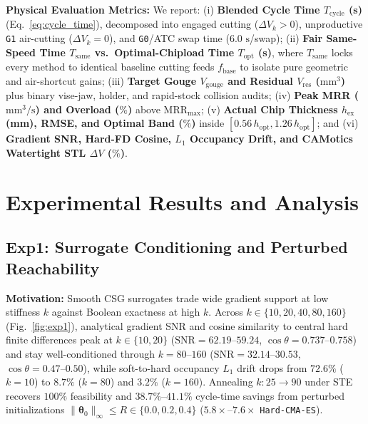 \documentclass[conference]{IEEEtran}
\begin{document}
\textbf{Physical Evaluation Metrics:}
We report: (i) \textbf{Blended Cycle Time $T_{\text{cycle}}$ (s)} (Eq.~\eqref{eq:cycle_time}), decomposed into engaged cutting ($\Delta V_k > 0$), unproductive \texttt{G1} air-cutting ($\Delta V_k = 0$), and \texttt{G0}/ATC swap time ($6.0\text{ s}$/swap); (ii) \textbf{Fair Same-Speed Time $T_{\text{same}}$ vs.\ Optimal-Chipload Time $T_{\text{opt}}$ (s)}, where $T_{\text{same}}$ locks every method to identical baseline cutting feeds $f_{\text{base}}$ to isolate pure geometric and air-shortcut gains; (iii) \textbf{Target Gouge $V_{\text{gouge}}$ and Residual $V_{\text{res}}$ ($\text{mm}^3$)} plus binary vise-jaw, holder, and rapid-stock collision audits; (iv) \textbf{Peak MRR ($\text{mm}^3/\text{s}$) and Overload ($\%$)} above $\text{MRR}_{\max}$; (v) \textbf{Actual Chip Thickness $h_{\text{ex}}$ (mm), RMSE, and Optimal Band ($\%$)} inside $[0.56\,h_{\text{opt}}, 1.26\,h_{\text{opt}}]$; and (vi) \textbf{Gradient SNR, Hard-FD Cosine, $L_1$ Occupancy Drift, and CAMotics Watertight STL $\Delta V$ ($\%$)}.

\section{Experimental Results and Analysis}
\label{sec:results}

\subsection{Exp1: Surrogate Conditioning and Perturbed Reachability}
\textbf{Motivation:} Smooth CSG surrogates trade wide gradient support at low stiffness $k$ against Boolean exactness at high $k$. Across $k \in \{10, 20, 40, 80, 160\}$ (Fig.~\ref{fig:exp1}), analytical gradient SNR and cosine similarity to central hard finite differences peak at $k \in \{10, 20\}$ ($\text{SNR} = \mathbf{62.19}\text{--}\mathbf{59.24}$, $\cos\theta = \mathbf{0.737}\text{--}\mathbf{0.758}$) and stay well-conditioned through $k = 80\text{--}160$ ($\text{SNR} = 32.14\text{--}30.53$, $\cos\theta = 0.47\text{--}0.50$), while soft-to-hard occupancy $L_1$ drift drops from $\mathbf{72.6\%}$ ($k=10$) to $\mathbf{8.7\%}$ ($k=80$) and $\mathbf{3.2\%}$ ($k=160$). Annealing $k: 25 \to 90$ under STE recovers $100\%$ feasibility and $38.7\%$--$41.1\%$ cycle-time savings from perturbed initializations $\|\boldsymbol{\theta}_0\|_\infty \le R \in \{0.0, 0.2, 0.4\}$ ($5.8\times$--$7.6\times$ \texttt{Hard-CMA-ES}).
\end{document}
